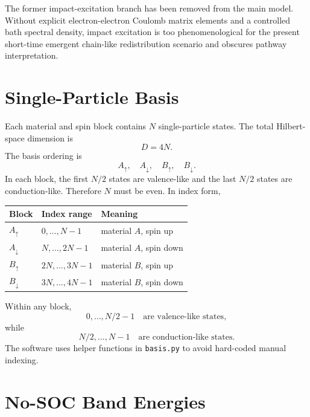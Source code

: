 \documentclass[11pt,a4paper]{article}
\begin{document}
The former impact-excitation branch has been removed from the main model.  Without explicit electron-electron Coulomb matrix elements and a controlled bath spectral density, impact excitation is too phenomenological for the present short-time emergent chain-like redistribution scenario and obscures pathway interpretation.

\section{Single-Particle Basis}

Each material and spin block contains $N$ single-particle states.  The total Hilbert-space dimension is
\begin{equation}
D = 4N.
\end{equation}
The basis ordering is
\begin{equation}
A_\uparrow,
\quad
A_\downarrow,
\quad
B_\uparrow,
\quad
B_\downarrow.
\end{equation}
In each block, the first $N/2$ states are valence-like and the last $N/2$ states are conduction-like.  Therefore $N$ must be even.  In index form,
\begin{center}
\begin{tabular}{lll}
\toprule
Block & Index range & Meaning \\
\midrule
$A_\uparrow$ & $0,\ldots,N-1$ & material $A$, spin up \\
$A_\downarrow$ & $N,\ldots,2N-1$ & material $A$, spin down \\
$B_\uparrow$ & $2N,\ldots,3N-1$ & material $B$, spin up \\
$B_\downarrow$ & $3N,\ldots,4N-1$ & material $B$, spin down \\
\bottomrule
\end{tabular}
\end{center}
Within any block,
\begin{equation}
0,\ldots,N/2-1 \quad \text{are valence-like states},
\end{equation}
while
\begin{equation}
N/2,\ldots,N-1 \quad \text{are conduction-like states}.
\end{equation}
The software uses helper functions in \texttt{basis.py} to avoid hard-coded manual indexing.

\section{No-SOC Band Energies}
\end{document}
